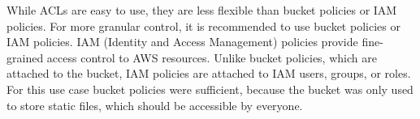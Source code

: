While ACLs are easy to use, they are less flexible than bucket policies or IAM policies. For more granular control, it is recommended to use bucket policies or IAM policies. IAM (Identity and Access Management) policies provide fine-grained access control to AWS resources. Unlike bucket policies, which are attached to the bucket, IAM policies are attached to IAM users, groups, or roles. For this use case bucket policies were sufficient, because the bucket was only used to store static files, which should be accessible by everyone.